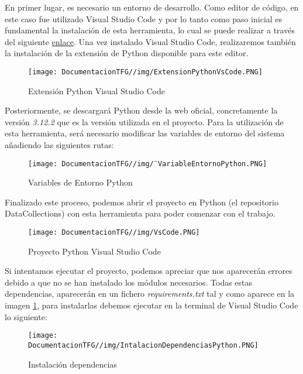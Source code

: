 En primer lugar, es necesario un entorno de desarrollo. Como editor de código, en este caso fue utilizado Visual Studio Code y por lo tanto como paso inicial es fundamental la instalación de esta herramienta, lo cual se puede realizar a través del siguiente \href{https://code.visualstudio.com/download}{enlace}. Una vez instalado Visual Studio Code, realizaremos también la instalación de la extensión de Python disponible para este editor.

\begin{figure}[H]
    \centering
    \texttt{[image: DocumentacionTFG//img/ExtensionPythonVsCode.PNG]}
    \caption{Extensión Python Visual Studio Code}
\end{figure}

Posteriormente, se descargará Python desde la web oficial, concretamente la versión \textit{3.12.2} que es la versión utilizada en el proyecto. Para la utilización de esta herramienta, será necesario modificar las variables de entorno del sistema añadiendo las siguientes rutas:

\begin{figure}[H]
    \centering
    \texttt{[image: DocumentacionTFG//img/¨VariableEntornoPython.PNG]}
    \caption{Variables de Entorno Python}
\end{figure}


Finalizado este proceso, podemos abrir el proyecto en Python (el repositorio DataCollections) con esta herramienta para poder comenzar con el trabajo.

\begin{figure}[H]
    \centering
    \texttt{[image: DocumentacionTFG//img/VsCode.PNG]}
    \caption{Proyecto Python Visual Studio Code}
    \label{fig:proyecto-vscode}
\end{figure}

Si intentamos ejecutar el proyecto, podemos apreciar que nos aparecerán errores debido a que no se han instalado los módulos necesarios. Todas estas dependencias, aparecerán en un fichero \textit{requirements.txt} tal y como aparece en la imagen \ref{fig:proyecto-vscode}, para instalarlas debemos ejecutar en la terminal de Visual Studio Code lo siguiente:

\begin{figure}[H]
    \centering
    \texttt{[image: DocumentacionTFG//img/IntalacionDependenciasPython.PNG]}
    \caption{Instalación dependencias}
\end{figure}

